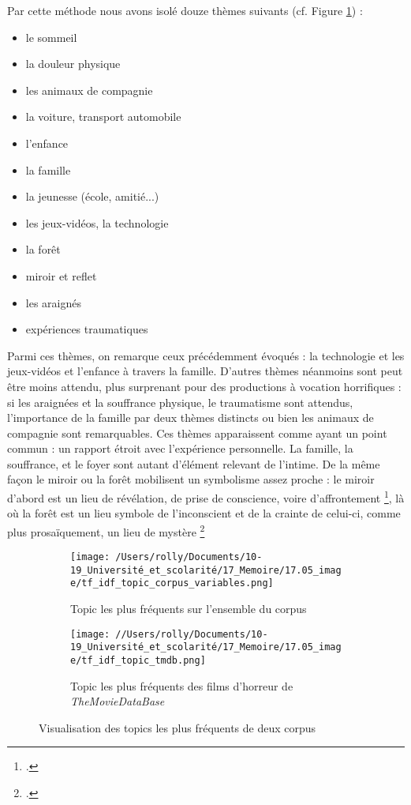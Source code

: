 \documentclass[12pt,a4paper,oneside,titlepage]{book} %
\begin{document}
	Par cette méthode nous avons isolé douze thèmes suivants (cf. Figure \ref{fig:topic_corpus}) : 
	\begin{itemize}
		\item le sommeil
		\item la douleur physique
		\item les animaux de compagnie
		\item la voiture, transport automobile
		\item l'enfance
		\item la famille
		\item la jeunesse (école, amitié...)
		\item les jeux-vidéos, la technologie
		\item la forêt
		\item miroir et reflet
		\item les araignés
		\item expériences traumatiques\\

		\end{itemize}

	Parmi ces thèmes, on remarque ceux précédemment évoqués : la technologie et les jeux-vidéos et l'enfance à travers la famille. D'autres thèmes néanmoins sont peut être moins attendu, plus surprenant pour des productions à vocation horrifiques : si les araignées et la souffrance physique, le traumatisme sont attendus, l'importance de la famille par deux thèmes distincts ou bien les animaux de compagnie sont remarquables. 
	Ces thèmes apparaissent comme ayant un point commun : un rapport étroit avec l'expérience personnelle. La famille, la souffrance, et le foyer sont autant d'élément relevant de l'intime. 
	De la même façon le miroir ou la forêt mobilisent un symbolisme assez proche : le miroir d'abord est un lieu de révélation, de prise de conscience, voire d'affrontement \footcite[voir p.639, article "Miroir"]{chevalier_dictionnaire_1990}, là où la forêt est un lieu symbole de l'inconscient et de la crainte de celui-ci, comme plus prosaïquement, un lieu de mystère \footcite[voir p.455, article "Forêt"]{chevalier_dictionnaire_1990}


	\begin{figure}[htbp]
	\centering
	\begin{subfigure}{0.45\textwidth}
		\texttt{[image: /Users/rolly/Documents/10-19\_Université\_et\_scolarité/17\_Memoire/17.05\_image/tf\_idf\_topic\_corpus\_variables.png]}
		\caption{Topic les plus fréquents sur l'ensemble du corpus}
		\label{fig:topic_corpus}
	\end{subfigure}
	\hfill
	\begin{subfigure}{0.45\textwidth}
		\texttt{[image: //Users/rolly/Documents/10-19\_Université\_et\_scolarité/17\_Memoire/17.05\_image/tf\_idf\_topic\_tmdb.png]}
		\caption{Topic les plus fréquents des films d'horreur de \emph{TheMovieDataBase}}
		\label{fig:topic_tmdb}
	\end{subfigure}
	\caption{Visualisation des topics les plus fréquents de deux corpus}
	\label{fig:topics_corpus}
	\end{figure}
	
\end{document}
